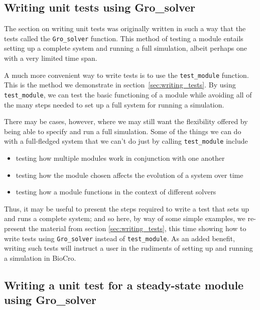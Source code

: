 \documentclass{article}\usepackage[]{graphicx}\usepackage[]{color}
\newcommand{\Rcode}[1]{\lstinline[style=Rstyle]{#1}}
\begin{document}
\begin{appendices}

\section{Writing unit tests using Gro\_solver}

The section on writing unit tests was originally written in such a way
that the tests called the \Rcode{Gro_solver} function.  This method of
testing a module entails setting up a complete system and running a
full simulation, albeit perhaps one with a very limited time span.

A much more convenient way to write tests is to use the
\Rcode{test_module} function. This is the method we demonstrate in
section~\ref{sec:writing_tests}.  By using \Rcode{test_module}, we can
test the basic functioning of a module while avoiding all of the many
steps needed to set up a full system for running a simulation.

There may be cases, however, where we may still want the flexibility
offered by being able to specify and run a full simulation.  Some of
the things we can do with a full-fledged system that we can't do just
by calling \Rcode{test_module} include

\begin{itemize}

\item testing how multiple modules work in conjunction with one
another

\item testing how the module chosen affects the evolution of a system
over time

\item testing how a module functions in the context of different
solvers

\end{itemize}

Thus, it may be useful to present the steps required to write a test
that sets up and runs a complete system; and so here, by way of some
simple examples, we re-present the material from section
\ref{sec:writing_tests}, this time showing how to write tests using
\Rcode{Gro_solver} instead of \Rcode{test_module}.  As an added
benefit, writing such tests will instruct a user in the rudiments of
setting up and running a simulation in BioCro.

\subsection{Writing a unit test for a steady-state module using
Gro\_solver}


\end{appendices}
\end{document}
